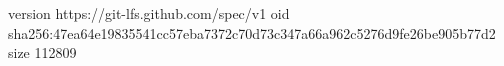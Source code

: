 version https://git-lfs.github.com/spec/v1
oid sha256:47ea64e19835541cc57eba7372c70d73c347a66a962c5276d9fe26be905b77d2
size 112809
